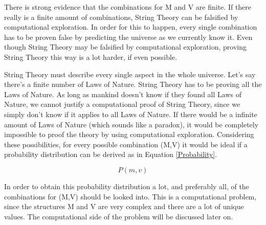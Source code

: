 \documentclass[../paper.tex]{subfiles}
\begin{document}
There is strong evidence that the combinations for M and V are finite. If there really is a finite amount of combinations, String Theory can be falsified by computational exploration. In order for this to happen, every single combination has to be proven false by predicting the universe as we currently know it. Even though String Theory may be falsified by computational exploration, proving String Theory this way is a lot harder, if even possible. 

String Theory must describe every single aspect in the whole universe. Let's say there's a finite number of Laws of Nature. String Theory has to be proving all the Laws of Nature. As long as mankind doesn't know if they found all Laws of Nature, we cannot justify a computational proof of String Theory, since we simply don't know if it applies to all Laws of Nature. If there would be a infinite amount of Laws of Nature (which sounds like a paradox), it would be completely impossible to proof the theory by using computational exploration. Considering these possibilities, for every possible combination (M,V) it would be ideal if a probability distribution can be derived as in Equation \ref{Probability}.

\begin{equation}
    P(m,v)
    \label{Probability}
\end{equation}

In order to obtain this probability distribution a lot, and preferably all, of the combinations for (M,V) should be looked into. This is a computational problem, since the structures M and V are very complex and there are a lot of unique values. The computational side of the problem will be discussed later on.
\end{document}
